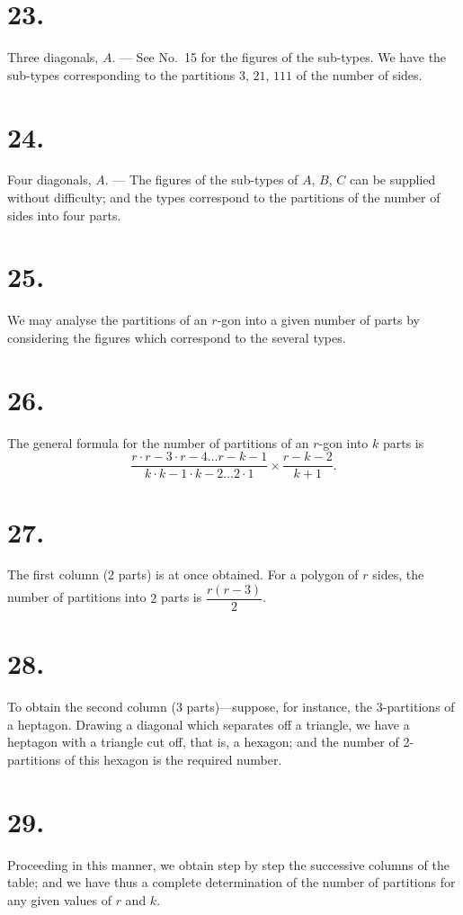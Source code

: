 \documentclass[11pt,a4paper]{book}
\begin{document}
\section*{23.}
Three diagonals, $A$. --- See No.~15 for the figures of the sub-types. We have the sub-types corresponding to the partitions $3$, $21$, $111$ of the number of sides.

\section*{24.}
Four diagonals, $A$. --- The figures of the sub-types of $A$, $B$, $C$ can be supplied without difficulty; and the types correspond to the partitions of the number of sides into four parts.

\section*{25.}
We may analyse the partitions of an $r$-gon into a given number of parts by considering the figures which correspond to the several types.

\section*{26.}
The general formula for the number of partitions of an $r$-gon into $k$ parts is
\[
\frac{r \cdot r - 3 \cdot r - 4 \ldots r - k - 1}{k \cdot k - 1 \cdot k - 2 \ldots 2 \cdot 1} \times \frac{r - k - 2}{k + 1}.
\]

\section*{27.}
The first column (2 parts) is at once obtained. For a polygon of $r$ sides, the number of partitions into $2$ parts is $\dfrac{r(r - 3)}{2}$.

\section*{28.}
To obtain the second column (3 parts)---suppose, for instance, the 3-partitions of a heptagon. Drawing a diagonal which separates off a triangle, we have a heptagon with a triangle cut off, that is, a hexagon; and the number of 2-partitions of this hexagon is the required number.

\section*{29.}
Proceeding in this manner, we obtain step by step the successive columns of the table; and we have thus a complete determination of the number of partitions for any given values of $r$ and $k$.
\end{document}
